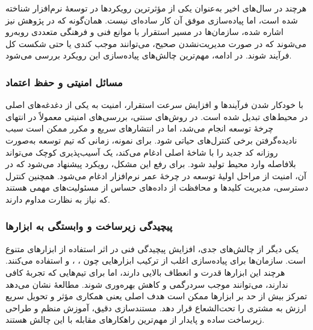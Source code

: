 
هرچند  در سال‌های اخیر به‌عنوان یکی از مؤثرترین رویکردها در توسعهٔ نرم‌افزار شناخته شده است، اما پیاده‌سازی موفق آن کار ساده‌ای نیست. همان‌گونه که در پژوهش \cite{Jha2023} نیز اشاره شده، سازمان‌ها در مسیر استقرار  با موانع فنی و فرهنگی متعددی روبه‌رو می‌شوند که در صورت مدیریت‌نشدن صحیح، می‌توانند موجب کندی یا حتی شکست کل فرآیند شوند. در ادامه، مهم‌ترین چالش‌های پیاده‌سازی این رویکرد بررسی می‌شود.

\subsubsection*{مسائل امنیتی و حفظ اعتماد}

با خودکار شدن فرآیندها و افزایش سرعت استقرار، امنیت به یکی از دغدغه‌های اصلی در محیط‌های  تبدیل شده است. در روش‌های سنتی، بررسی‌های امنیتی معمولاً در انتهای چرخهٔ توسعه انجام می‌شد، اما در  انتشارهای سریع و مکرر ممکن است سبب نادیده‌گرفتن برخی کنترل‌های حیاتی شود. برای نمونه، زمانی که تیم توسعه به‌صورت روزانه کد جدید را با شاخهٔ اصلی ادغام می‌کند، یک آسیب‌پذیری کوچک می‌تواند بلافاصله وارد محیط تولید شود.
برای رفع این مشکل، رویکرد  پیشنهاد می‌شود که در آن، امنیت از مراحل اولیهٔ توسعه در چرخهٔ عمر نرم‌افزار ادغام می‌شود. همچنین کنترل دسترسی، مدیریت کلیدها و محافظت از داده‌های حساس از مسئولیت‌های مهمی هستند که نیاز به نظارت مداوم دارند.

\subsubsection*{پیچیدگی زیرساخت و وابستگی به ابزارها}

یکی دیگر از چالش‌های جدی، افزایش پیچیدگی فنی در اثر استفاده از ابزارهای متنوع است. سازمان‌ها برای پیاده‌سازی  اغلب از ترکیب ابزارهایی چون ، ،  و  استفاده می‌کنند. هرچند این ابزارها قدرت و انعطاف بالایی دارند، اما برای تیم‌هایی که تجربهٔ کافی ندارند، می‌توانند موجب سردرگمی و کاهش بهره‌وری شوند.
مطالعهٔ \cite{Jha2023} نشان می‌دهد تمرکز بیش از حد بر ابزارها ممکن است هدف اصلی  یعنی همکاری مؤثر و تحویل سریع ارزش به مشتری را تحت‌الشعاع قرار دهد. مستندسازی دقیق، آموزش منظم و طراحی زیرساخت ساده و پایدار از مهم‌ترین راهکارهای مقابله با این چالش هستند.

